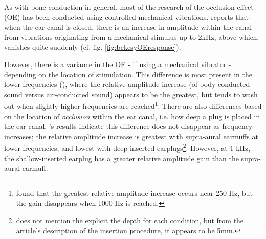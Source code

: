 \documentclass[dissertation,copyright]{uathesis}
\begin{document}

 
As with bone conduction in general, most of the research of the occlusion effect (OE) has been conducted using controlled mechanical vibrations.  \cite{bekesy:60} reports that when the ear canal is closed, there is an increase in amplitude within the canal from vibrations originating from a mechanical stimulus up to 2kHz, above which, vanishes quite suddenly (cf. fig. \ref{fig:bekesyOEresponse}).

However, there is a variance in the OE - if using a mechanical vibrator - depending on the location of stimulation.  This difference is most present in the lower frequencies (\cite{dean:00}), where the relative amplitude increase (of body-conducted sound versus air-conducted sound) appears to be the greatest, but tends to wash out when slightly higher frequencies are reached\footnote{\cite{dean:00} found that the greatest relative amplitude increase occurs near 250 Hz, but the gain disappears when 1000 Hz is reached.}.  There are also differences based on the location of \textit{occlusion} within the ear canal, i.e. how deep a plug is placed in the ear canal. \cite{dean:00}'s results indicate this difference does not disappear as frequency increases; the relative amplitude increase is greatest with supra-aural earmuffs at lower frequencies, and lowest with deep inserted earplugs\footnote{\cite{dean:00} does not mention the explicit the depth for each condition, but from the article's description of the insertion procedure, it appears to be \~5mm.}. However, at 1 kHz, the shallow-inserted earplug has a greater relative amplitude gain than the supra-aural earmuff.
\end{document}
